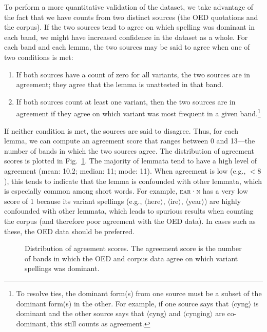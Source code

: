 \documentclass[doc,biblatex]{apa7}
\newcommand\lemma[2]{\textsc{#1·#2}}
\newcommand\spelling[1]{\allowbreak$\langle$#1$\rangle$}
\begin{document}
To perform a more quantitative validation of the dataset, we take advantage of the fact that we have counts from two distinct sources (the OED quotations and the corpus). If the two sources tend to agree on which spelling was dominant in each band, we might have increased confidence in the dataset as a whole. For each band and each lemma, the two sources may be said to agree when one of two conditions is met:
\begin{enumerate}
\item If both sources have a count of zero for all variants, the two sources are in agreement; they agree that the lemma is unattested in that band.
\item If both sources count at least one variant, then the two sources are in agreement if they agree on which variant was most frequent in a given band.\footnote{To resolve ties, the dominant form(s) from one source must be a subset of the dominant form(s) in the other. For example, if one source says that \spelling{cyng} is dominant and the other source says that \spelling{cyng} and \spelling{cynging} are co-dominant, this still counts as agreement.}
\end{enumerate}
If neither condition is met, the sources are said to disagree. Thus, for each lemma, we can compute an agreement score that ranges between 0 and 13---the number of bands in which the two sources agree. The distribution of agreement scores is plotted in Fig.~\ref{agreement}. The majority of lemmata tend to have a high level of agreement (mean: 10.2; median: 11; mode: 11). When agreement is low (e.g., $< 8$), this tends to indicate that the lemma is confounded with other lemmata, which is especially common among short words. For example, \lemma{ear}{n} has a very low score of 1 because its variant spellings (e.g., \spelling{here}, \spelling{ire}, \spelling{year}) are highly confounded with other lemmata, which leads to spurious results when counting the corpus (and therefore poor agreement with the OED data). In cases such as these, the OED data should be preferred.

	\begin{figure}
	\vspace*{2pt}
	\caption{Distribution of agreement scores. The agreement score is the number of bands in which the OED and corpus data agree on which variant spellings was dominant.}
	\label{agreement}
	\end{figure}
\end{document}
